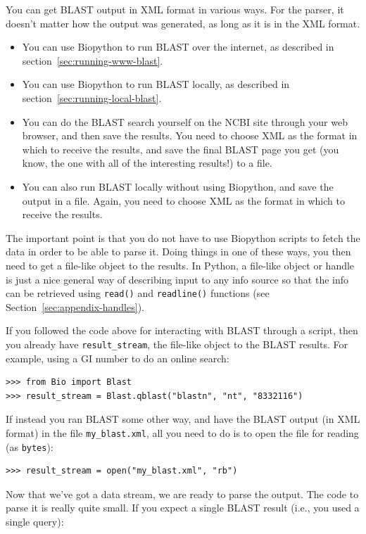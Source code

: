 You can get BLAST output in XML format in various ways. For the parser, it
doesn't matter how the output was generated, as long as it is in the XML format.
\begin{itemize}
\item You can use Biopython to run BLAST over the internet, as described in
section~\ref{sec:running-www-blast}.
\item You can use Biopython to run BLAST locally, as described in
section~\ref{sec:running-local-blast}.
\item You can do the BLAST search yourself on the NCBI site through your
web browser, and then save the results. You need to choose XML as the format
in which to receive the results, and save the final BLAST page you get
(you know, the one with all of the interesting results!) to a file.
\item You can also run BLAST locally without using Biopython, and save
the output in a file. Again, you need to choose XML as the format in which
to receive the results.
\end{itemize}
The important point is that you do not have to use Biopython
scripts to fetch the data in order to be able to parse it.
Doing things in one of these ways, you then need to get a file-like object
to the results. In Python, a file-like object or handle is just a nice general way of describing input to any info source so that the info can be retrieved
using \verb|read()| and \verb|readline()| functions
(see Section~\ref{sec:appendix-handles}).

If you followed the code above for interacting with BLAST through a
script, then you already have \verb|result_stream|, the file-like object to the
BLAST results.  For example, using a GI number to do an online search:

\begin{verbatim}
>>> from Bio import Blast
>>> result_stream = Blast.qblast("blastn", "nt", "8332116")
\end{verbatim}

If instead you ran BLAST some other way, and have the
BLAST output (in XML format) in the file \verb|my_blast.xml|, all you
need to do is to open the file for reading (as \verb|bytes|):

\begin{verbatim}
>>> result_stream = open("my_blast.xml", "rb")
\end{verbatim}

Now that we've got a data stream, we are ready to parse the output. The
code to parse it is really quite small.  If you expect a single
BLAST result (i.e., you used a single query):

